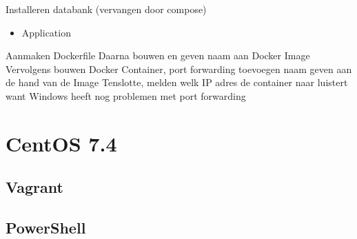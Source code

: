 Installeren databank (vervangen door compose)

\begin{itemize}[noitemsep]
	\item Application
\end{itemize}

Aanmaken Dockerfile
Daarna bouwen en geven naam aan Docker Image
Vervolgens bouwen Docker Container, port forwarding toevoegen naam geven aan de hand van de Image
Tenslotte, melden welk IP adres de container naar luistert want Windows heeft nog problemen met port forwarding

\section{CentOS 7.4}

\subsection{Vagrant}


\subsection{PowerShell}


